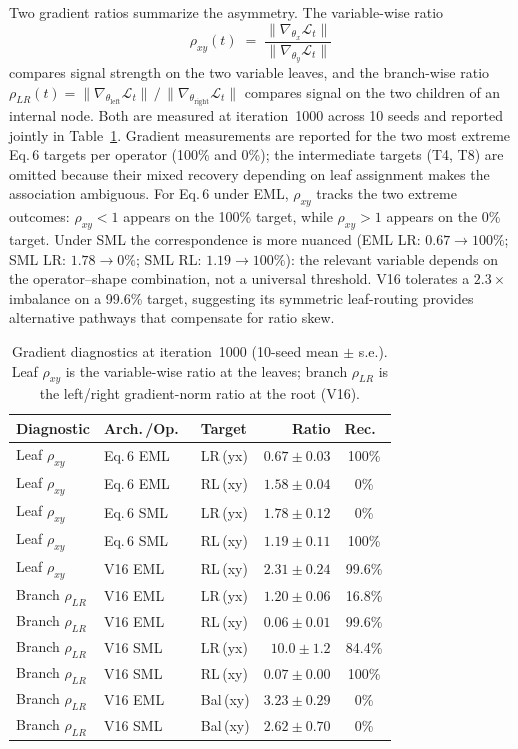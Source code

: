 Two gradient ratios summarize the asymmetry.  The variable-wise
ratio
\begin{equation}
  \rho_{xy}(t) \;=\; \frac{\|\nabla_{\theta_x} \mathcal{L}_t\|}{\|\nabla_{\theta_y} \mathcal{L}_t\|}
  \label{eq:rho-xy}
\end{equation}
compares signal strength on the two variable leaves, and the
branch-wise ratio
$\rho_{LR}(t) = \|\nabla_{\theta_{\text{left}}} \mathcal{L}_t\| \,/\,
\|\nabla_{\theta_{\text{right}}} \mathcal{L}_t\|$
compares signal on the two children of an internal node.  Both are
measured at iteration~1000 across 10 seeds and reported jointly in
Table~\ref{tab:gradients}.  Gradient measurements are reported for the
two most extreme Eq.\,6 targets per operator (100\% and 0\%); the
intermediate targets (T4, T8) are omitted because their mixed
recovery depending on leaf assignment makes the association
ambiguous.  For Eq.\,6 under EML, $\rho_{xy}$ tracks the two
extreme outcomes: $\rho_{xy} < 1$ appears on the 100\% target,
while $\rho_{xy} > 1$ appears on the 0\% target.  Under SML the
correspondence is more nuanced (EML LR: $0.67 \to 100\%$; SML LR:
$1.78 \to 0\%$; SML RL: $1.19 \to 100\%$): the relevant variable
depends on the operator--shape combination, not a universal
threshold.  V16 tolerates a $2.3\times$ imbalance on a 99.6\%
target, suggesting its symmetric leaf-routing provides alternative
pathways that compensate for ratio skew.

\begin{table}[t]
\centering
\caption{Gradient diagnostics at iteration~1000 (10-seed mean
$\pm$ s.e.).  Leaf $\rho_{xy}$ is the variable-wise ratio at
the leaves; branch $\rho_{LR}$ is the left/right gradient-norm
ratio at the root (V16).}
\label{tab:gradients}
\footnotesize
\begin{tabular}{@{}lllrc@{}}
\toprule
Diagnostic        & Arch.\,/Op.\ & Target     & Ratio          & Rec.\ \\
\midrule
Leaf $\rho_{xy}$  & Eq.\,6 EML  & LR\,(yx)  & $0.67\pm0.03$  & 100\% \\
Leaf $\rho_{xy}$  & Eq.\,6 EML  & RL\,(xy)  & $1.58\pm0.04$  & 0\% \\
Leaf $\rho_{xy}$  & Eq.\,6 SML  & LR\,(yx)  & $1.78\pm0.12$  & 0\% \\
Leaf $\rho_{xy}$  & Eq.\,6 SML  & RL\,(xy)  & $1.19\pm0.11$  & 100\% \\
Leaf $\rho_{xy}$  & V16 EML     & RL\,(xy)  & $2.31\pm0.24$  & 99.6\% \\
\midrule
Branch $\rho_{LR}$ & V16 EML    & LR\,(yx)  & $1.20\pm0.06$  & 16.8\% \\
Branch $\rho_{LR}$ & V16 EML    & RL\,(xy)  & $0.06\pm0.01$  & 99.6\% \\
Branch $\rho_{LR}$ & V16 SML    & LR\,(yx)  & $10.0\pm1.2$   & 84.4\% \\
Branch $\rho_{LR}$ & V16 SML    & RL\,(xy)  & $0.07\pm0.00$  & 100\% \\
Branch $\rho_{LR}$ & V16 EML    & Bal\,(xy) & $3.23\pm0.29$  & 0\% \\
Branch $\rho_{LR}$ & V16 SML    & Bal\,(xy) & $2.62\pm0.70$  & 0\% \\
\bottomrule
\end{tabular}
\end{table}

